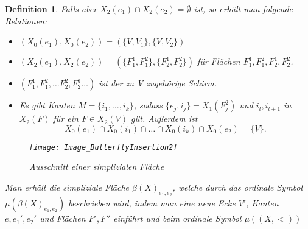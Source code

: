 \documentclass[12pt,titlepage,twoside,cleardoublepage]{article}
\theoremstyle{nummermitklammern}
\newtheorem{definition}[temp]{Definition}
\newtheorem{definition}[zahl]{Definition}
\numberwithin{equation}{section}
\begin{document}
\begin{definition}
\begin{comment}
\item  bei der Beschreibung  für die Ecken-Kanten-Inzidenz $\{V',V''\}$ für die Kante $e$, $\{V,V_1\}$ für die Kante $e_1'$ und  $\{V,V_2\}$ für die Kante $e_2'$ hinzufügt,
\item und bei der Beschreibung für die Kanten-Flächen Inzidenz  man $\{e,e_1,e_1'\}$ für die Fläche $F'$ und $\{e,e_2,e_2'\}$ für die Fläche $F''$ hinzugefügt wird.
 \end{itemize}
 \end{comment}
Falls aber $X_2(e_1)\cap X_2(e_2)=\emptyset$ ist, so erhält man folgende Relationen: 
\begin{itemize}
\item $(X_0(e_1),X_0(e_2))=(\{V,V_1\},\{V,V_2\})$
\item $(X_2(e_1),X_2(e_2))=(\{F_1^1,F_1^2\},\{F_2^1,F_2^2\})$ für Flächen $F_1^1,F_1^2,F_2^1,F_2^2$.
\item $(F_1^1,F_1^2,\ldots F_2^2,F_2^1\ldots)$ ist der zu V zugehörige Schirm.
\item Es gibt Kanten $M=\{i_1,\ldots,i_k\}$, sodass $\{e_j,i_j\}=X_1( F_j^2)$ und $i_l,i_{l+1}$ in $X_2(F)$ für ein $F\in X_2(V)$ gilt. Außerdem ist
\[
X_0(e_1)\cap X_0(i_1)\cap \ldots \cap X_0(i_k)\cap X_0(e_2)=\{V\}.
\]
\end{itemize}

\begin{figure}[H]
\begin{center}
\texttt{[image: Image\_ButterflyInsertion2]}
\end{center}
\caption{Ausschnitt einer simplizialen Fläche}
\end{figure}

Man erhält die simpliziale Fläche $\beta(X)_{e_1,e_2}$, welche durch das ordinale Symbol $\mu(\beta(X)_{e_1,e_2})$ beschrieben wird, indem man eine neue Ecke $V'$, Kanten $e,e_1',e_2'$ und Flächen $F',F''$ einführt und beim ordinale Symbol $\mu((X,<))$


\end{definition}
\end{document}
